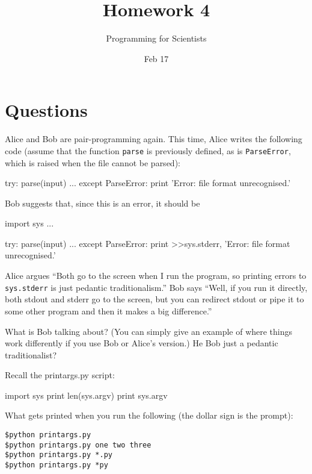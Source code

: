 
\author{Programming for Scientists}
\title{Homework 4}
\date{Feb 17}

\maketitle

\chapter{Questions}

\question %
Alice and Bob are pair-programming again. This time, Alice writes the following code (assume that the function \lstinline{parse} is previously defined, as is \lstinline{ParseError}, which is raised when the file cannot be parsed):

\begin{python}
try:
    parse(input)
    ...
except ParseError:
    print 'Error: file format unrecognised.'
\end{python}

Bob suggests that, since this is an error, it should be 

\begin{python}
import sys
...

try:
    parse(input)
    ...
except ParseError:
    print >>sys.stderr, 'Error: file format unrecognised.'
\end{python}

Alice argues ``Both go to the screen when I run the program, so printing errors to \lstinline{sys.stderr} is just pedantic traditionalism.'' Bob says ``Well, if you run it directly, both stdout and stderr go to the screen, but you can redirect stdout or pipe it to some other program and then it makes a big difference.''

What is Bob talking about? (You can simply give an example of where things work differently if you use Bob or Alice's version.) He Bob just a pedantic traditionalist?

\question %
Recall the printargs.py script:

\begin{python}
import sys
print len(sys.argv)
print sys.argv
\end{python}

What gets printed when you run the following (the dollar sign is the prompt):

\begin{verbatim}
$python printargs.py
$python printargs.py one two three
$python printargs.py *.py
$python printargs.py *py
\end{verbatim}

